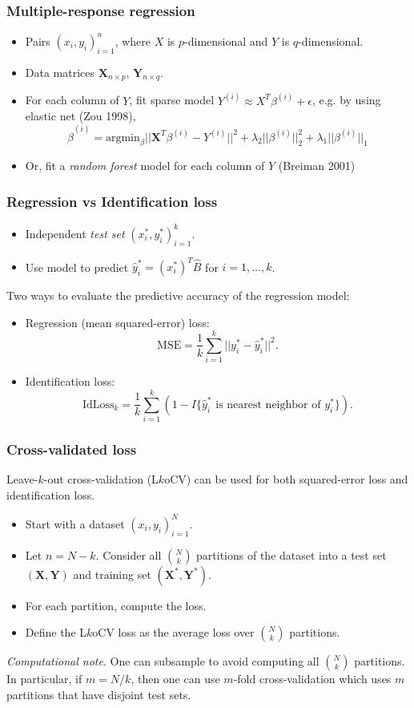 \documentclass{beamer}
\newcommand{\bX}{\boldsymbol{X}}
\newcommand{\bY}{\boldsymbol{Y}}
\begin{document}
\begin{frame}
\frametitle{Multiple-response regression}
\begin{itemize}
\item Pairs $(x_i,y_i)_{i=1}^n$, where $X$ is $p$-dimensional and $Y$ is $q$-dimensional.
\item Data matrices $\bX_{n \times p}$, $\bY_{n \times q}$.
\item For each column of $Y$, fit sparse model $Y^{(i)} \approx X^T \beta^{(i)}  + \epsilon$, e.g. by using elastic net (Zou 1998), 
\[
\hat{\beta}^{(i)} = \text{argmin}_\beta ||\bX^T \beta^{(i)} - Y^{(i)}||^2 + \lambda_2 ||\beta^{(i)}||_2^2 + \lambda_1 ||\beta^{(i)}||_1
\]
\item Or, fit a \emph{random forest} model for each column of $Y$ (Breiman 2001)
\end{itemize}
\end{frame}


\begin{frame}
\frametitle{Regression vs Identification loss}
\begin{itemize}
\item Independent \emph{test set} $(x_i^*, y_i^*)_{i=1}^k$. 
\item Use model to predict $\hat{y}_i^* = (x_i^*)^T \hat{B}$ for $i = 1,\hdots, k$.
\end{itemize}
Two ways to evaluate the predictive accuracy of the regression model:
\begin{itemize}
\item Regression (mean squared-error) loss:
\[
\text{MSE} = \frac{1}{k} \sum_{i=1}^k ||y_i^* - \hat{y}_i^*||^2.
\]
\item Identification loss:
\[
\text{IdLoss}_k = \frac{1}{k} \sum_{i=1}^k (1 - I\{\hat{y}_i^* \text{ is nearest neighbor of }y_i^*\}).
\]
\end{itemize}
\end{frame}

\begin{frame}
\frametitle{Cross-validated loss}
Leave-$k$-out cross-validation (L$k$oCV) can be used for both squared-error loss and identification loss.
\begin{itemize}
\item Start with a dataset $(x_i,y_i)_{i=1}^N$.
\item Let $n = N-k$.  Consider all ${N}\choose{k}$ partitions of the dataset into a test set $(\bX, \bY)$ and training set $(\bX^*, \bY^*)$.
\item For each partition, compute the loss.
\item Define the L$k$oCV loss as the average loss over ${N}\choose{k}$ partitions.
\end{itemize}
\emph{Computational note}.  One can subsample to avoid computing all
${N}\choose{k}$ partitions.  In particular, if $m = N/k$, then one can
use $m$-fold cross-validation which uses $m$ partitions that have
disjoint test sets.
\end{frame}
\end{document}
